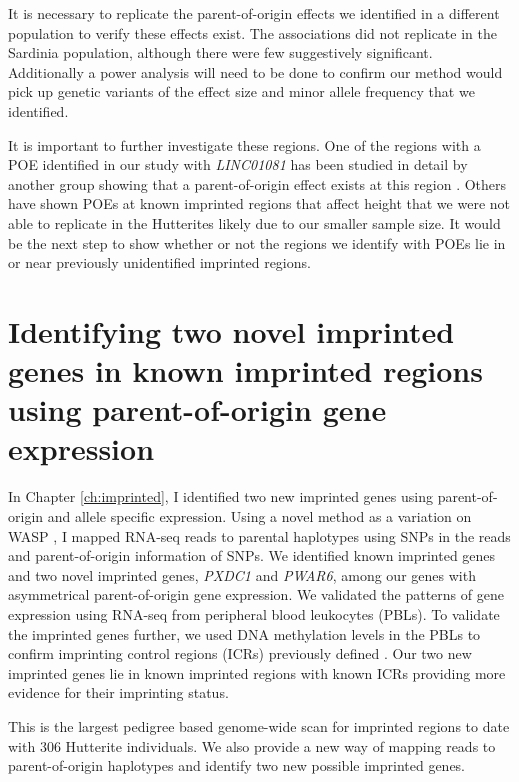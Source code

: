 It is necessary to replicate the parent-of-origin effects we identified in a different population to verify these effects exist. The associations did not replicate in the Sardinia population, although there were few suggestively significant. Additionally a power analysis will need to be done to confirm our method would pick up genetic variants of the effect size and minor allele frequency that we identified.

It is important to further investigate these regions. One of the regions with a POE identified in our study with \emph{LINC01081} has been studied in detail by another group showing that a parent-of-origin effect exists at this region \cite{Szafranski:2016fz}. Others have shown POEs at known imprinted regions that affect height \cite{Benonisdottir:2016dz,Zoledziewska:2015do} that we were not able to replicate in the Hutterites likely due to our smaller sample size. It would be the next step to show whether or not the regions we identify with POEs lie in or near previously unidentified imprinted regions.
 
\section{Identifying two novel imprinted genes in known imprinted regions using parent-of-origin gene expression}

In Chapter \ref{ch:imprinted}, I identified two new imprinted genes using parent-of-origin and allele specific expression. Using a novel method as a variation on WASP \cite{vandeGeijn:2015hi}, I mapped RNA-seq reads to parental haplotypes using SNPs in the reads and parent-of-origin information of SNPs. We identified known imprinted genes and two novel imprinted genes, \emph{PXDC1} and \emph{PWAR6}, among our genes with asymmetrical parent-of-origin gene expression. We validated the patterns of gene expression using RNA-seq from peripheral blood leukocytes (PBLs). To validate the imprinted genes further, we used DNA methylation levels in the PBLs to confirm imprinting control regions (ICRs) previously defined \cite{Joshi:2016bb,Court:2014kc}. Our two new imprinted genes lie in known imprinted regions with known ICRs providing more evidence for their imprinting status.
 
This is the largest pedigree based genome-wide scan for imprinted regions to date with 306 Hutterite individuals. We also provide a new way of mapping reads to parent-of-origin haplotypes and identify two new possible imprinted genes.

